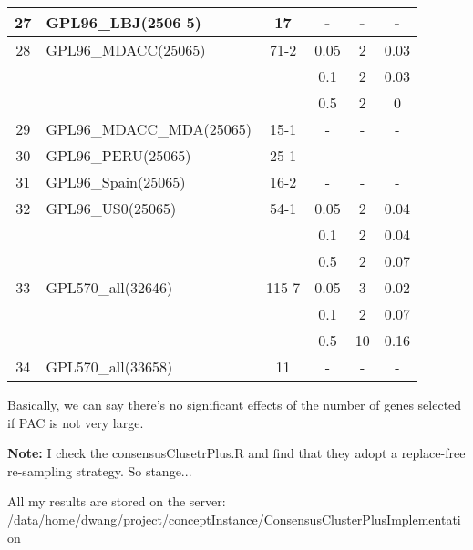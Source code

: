 \documentclass[12pt]{article}
\begin{document}
\begin{longtable}{c|l|cccc}
  \hline
  27 & GPL96\_LBJ(2506 5) & 17 & - &  -&- \\
  \hline
  28 & GPL96\_MDACC(25065) & 71-2 & 0.05 &2 & 0.03 \\
                        & & & 0.1 & 2& 0.03 \\
  & & & 0.5 & 2 & 0 \\ \hline
  29 & GPL96\_MDACC\_MDA(25065) & 15-1 & -& -&- \\
  \hline
  30 & GPL96\_PERU(25065) & 25-1 & - & -&- \\
  \hline
  31 & GPL96\_Spain(25065) & 16-2 & - &  -&- \\
  \hline
  32 & GPL96\_US0(25065) & 54-1 & 0.05 & 2 & 0.04 \\
                        & & & 0.1 &2 & 0.04 \\
  & & & 0.5 & 2 & 0.07 \\ \hline
  33 & GPL570\_all(32646) & 115-7 & 0.05 & 3 & 0.02 \\
                        & & & 0.1 & 2&0.07  \\
  & & & 0.5 & 10 & 0.16 \\ \hline
  34 & GPL570\_all(33658) & 11 & - & - & - \\
  \hline
\end{longtable}

Basically, we can say there's no significant effects of the number of genes
selected if PAC is not very large.

{\bf Note:} I check the consensusClusetrPlus.R and find that they adopt a
replace-free re-sampling strategy. So stange...

All my results are stored on the server:
/data/home/dwang/project/conceptInstance/ConsensusClusterPlusImplementation
\end{document}
